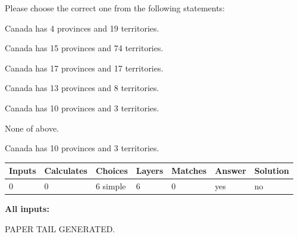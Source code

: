 \documentclass[12pt]{article}
\begin{document}
  
Please choose the correct one from the following statements:
 
 
Canada has   4 provinces and  19 territories.
 
 
Canada has  15 provinces and  74 territories.
 
 
Canada has  17 provinces and  17 territories.
 
 
Canada has  13 provinces and  8 territories.
 
 
Canada has 10  provinces and 3 territories.
 
 
 None of above.
 
 
\noindent{}
 
 
Canada has 10  provinces and 3 territories.
 
 
\noindent{}
 
 
   
   
   
   
\noindent\begin{tabular}{|l|l|l|l|l|l|l|}
 \hline
Inputs & Calculates & Choices & Layers & Matches & Answer & Solution \\ \hline
 0  & 
 0  & 
 6
  simple  
  & 
 6  & 
 0  & 
  yes & 
  no 
  \\ \hline
 \end{tabular}
   
   
   
   
\noindent{}
   
   
   
   
\noindent\vspace{0.1in}\hspace{-0.08in} {\textbf{\Large{All inputs: }}}
   
   
   
   
   
   
 \vspace{0.2in}
 
   
   
\vspace{2.0in} PAPER TAIL GENERATED.
   
   
   
\end{document}
